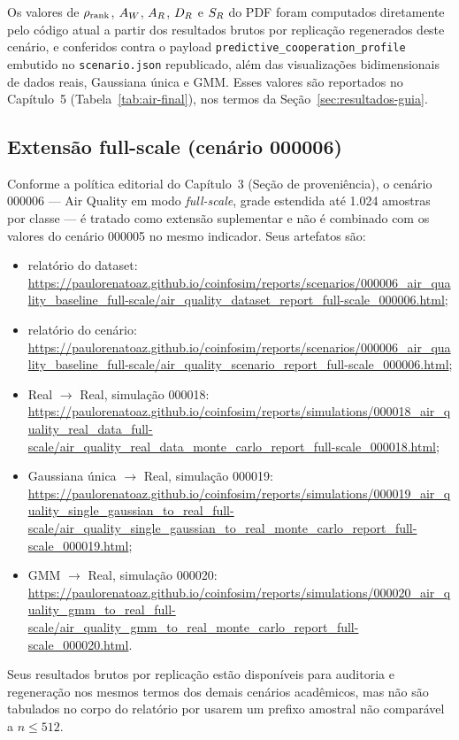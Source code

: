 Os valores de $\rho_{\mathrm{rank}}$, $A_W$, $A_R$, $D_R$ e $S_R$ do PDF foram computados diretamente pelo código atual a partir dos resultados brutos por replicação regenerados deste cenário, e conferidos contra o payload \texttt{predictive\_cooperation\_profile} embutido no \texttt{scenario.json} republicado, além das visualizações bidimensionais de dados reais, Gaussiana única e GMM. Esses valores são reportados no Capítulo~5 (Tabela~\ref{tab:air-final}), nos termos da Seção~\ref{sec:resultados-guia}.

\subsection{Extensão full-scale (cenário 000006)}

Conforme a política editorial do Capítulo~3 (Seção de proveniência), o cenário 000006 --- Air Quality em modo \textit{full-scale}, grade estendida até 1.024 amostras por classe --- é tratado como extensão suplementar e não é combinado com os valores do cenário 000005 no mesmo indicador. Seus artefatos são:

\begin{itemize}
  \item relatório do dataset: \url{https://paulorenatoaz.github.io/coinfosim/reports/scenarios/000006_air_quality_baseline_full-scale/air_quality_dataset_report_full-scale_000006.html};
  \item relatório do cenário: \url{https://paulorenatoaz.github.io/coinfosim/reports/scenarios/000006_air_quality_baseline_full-scale/air_quality_scenario_report_full-scale_000006.html};
  \item Real $\rightarrow$ Real, simulação 000018: \url{https://paulorenatoaz.github.io/coinfosim/reports/simulations/000018_air_quality_real_data_full-scale/air_quality_real_data_monte_carlo_report_full-scale_000018.html};
  \item Gaussiana única $\rightarrow$ Real, simulação 000019: \url{https://paulorenatoaz.github.io/coinfosim/reports/simulations/000019_air_quality_single_gaussian_to_real_full-scale/air_quality_single_gaussian_to_real_monte_carlo_report_full-scale_000019.html};
  \item GMM $\rightarrow$ Real, simulação 000020: \url{https://paulorenatoaz.github.io/coinfosim/reports/simulations/000020_air_quality_gmm_to_real_full-scale/air_quality_gmm_to_real_monte_carlo_report_full-scale_000020.html}.
\end{itemize}

Seus resultados brutos por replicação estão disponíveis para auditoria e regeneração nos mesmos termos dos demais cenários acadêmicos, mas não são tabulados no corpo do relatório por usarem um prefixo amostral não comparável a $n\leq512$.

